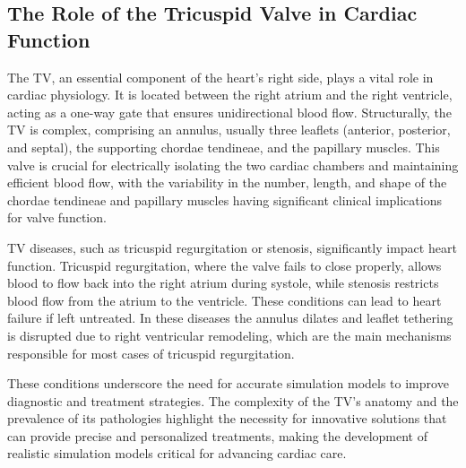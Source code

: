 
\subsection{The Role of the Tricuspid Valve in Cardiac Function}

The \gls{TV}, an essential component of the heart's right side, plays a vital role in cardiac physiology. It is located between the right atrium and the right ventricle, acting as a one-way gate that ensures unidirectional blood flow. Structurally, the \gls{TV} is complex, comprising an annulus, usually three leaflets (anterior, posterior, and septal), the supporting chordae tendineae, and the papillary muscles. This valve is crucial for electrically isolating the two cardiac chambers and maintaining efficient blood flow, with the variability in the number, length, and shape of the chordae tendineae and papillary muscles having significant clinical implications for valve function. \cite{sandersTricuspidValveEmbryology2014}


\gls{TV} diseases, such as tricuspid regurgitation or stenosis, significantly impact heart function. Tricuspid regurgitation, where the valve fails to close properly, allows blood to flow back into the right atrium during systole, while stenosis restricts blood flow from the atrium to the ventricle. These conditions can lead to heart failure if left untreated. In these diseases the annulus dilates and leaflet tethering is disrupted due to right ventricular remodeling, which are the main mechanisms responsible for most cases of tricuspid regurgitation.
\cite{buzzattiAnatomyTricuspidValve2018}

\mynewline
These conditions underscore the need for accurate simulation models to improve diagnostic and treatment strategies. The complexity of the \gls{TV}'s anatomy and the prevalence of its pathologies highlight the necessity for innovative solutions that can provide precise and personalized treatments, making the development of realistic simulation models critical for advancing cardiac care.


